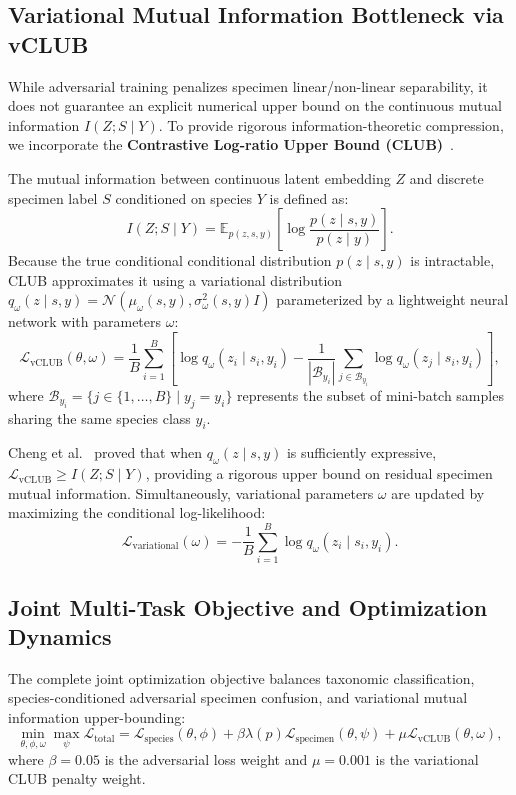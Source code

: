 \documentclass[a4paper,fleqn]{cas-sc}
\begin{document}
\subsection{Variational Mutual Information Bottleneck via vCLUB}
While adversarial training penalizes specimen linear/non-linear separability, it does not guarantee an explicit numerical upper bound on the continuous mutual information $I(Z; S \mid Y)$. To provide rigorous information-theoretic compression, we incorporate the \textbf{Contrastive Log-ratio Upper Bound (CLUB)}~\cite{cheng2020club}.

The mutual information between continuous latent embedding $Z$ and discrete specimen label $S$ conditioned on species $Y$ is defined as:
\begin{equation}
    I(Z; S \mid Y) = \mathbb{E}_{p(z, s, y)} \left[ \log \frac{p(z \mid s, y)}{p(z \mid y)} \right].
\end{equation}
Because the true conditional conditional distribution $p(z \mid s, y)$ is intractable, CLUB approximates it using a variational distribution $q_\omega(z \mid s, y) = \mathcal{N}(\mu_\omega(s, y), \sigma^2_\omega(s, y) I)$ parameterized by a lightweight neural network with parameters $\omega$:
\begin{equation}
    \mathcal{L}_{\text{vCLUB}}(\theta, \omega) = \frac{1}{B} \sum_{i=1}^B \left[ \log q_\omega(z_i \mid s_i, y_i) - \frac{1}{|\mathcal{B}_{y_i}|} \sum_{j \in \mathcal{B}_{y_i}} \log q_\omega(z_j \mid s_i, y_i) \right],
\end{equation}
where $\mathcal{B}_{y_i} = \{j \in \{1,\dots,B\} \mid y_j = y_i\}$ represents the subset of mini-batch samples sharing the same species class $y_i$. 

Cheng et al.~\cite{cheng2020club} proved that when $q_\omega(z \mid s, y)$ is sufficiently expressive, $\mathcal{L}_{\text{vCLUB}} \ge I(Z; S \mid Y)$, providing a rigorous upper bound on residual specimen mutual information. Simultaneously, variational parameters $\omega$ are updated by maximizing the conditional log-likelihood:
\begin{equation}
    \mathcal{L}_{\text{variational}}(\omega) = -\frac{1}{B} \sum_{i=1}^B \log q_\omega(z_i \mid s_i, y_i).
\end{equation}

\subsection{Joint Multi-Task Objective and Optimization Dynamics}
The complete joint optimization objective balances taxonomic classification, species-conditioned adversarial specimen confusion, and variational mutual information upper-bounding:
\begin{equation}
    \min_{\theta, \phi, \omega} \max_\psi \mathcal{L}_{\text{total}} = \mathcal{L}_{\text{species}}(\theta, \phi) + \beta \lambda(p) \mathcal{L}_{\text{specimen}}(\theta, \psi) + \mu \mathcal{L}_{\text{vCLUB}}(\theta, \omega),
\end{equation}
where $\beta = 0.05$ is the adversarial loss weight and $\mu = 0.001$ is the variational CLUB penalty weight.
\end{document}
